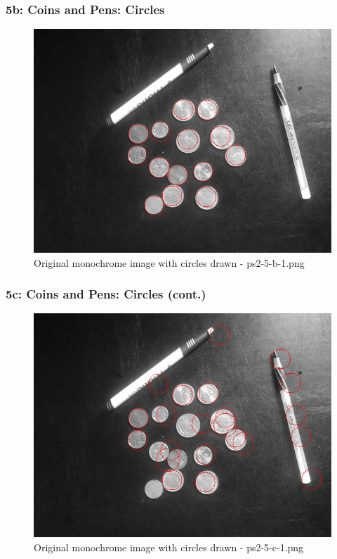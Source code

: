     \begin{frame}
		\frametitle{5b: Coins and Pens: Circles}
		
		\begin{figure}[!htb]
			\centering
			\includegraphics[height=0.65\textheight]{./output/ps2-5-b-1.png}
			\caption{Original monochrome image with circles drawn - ps2-5-b-1.png} 
		\end{figure}	
		
	\end{frame}
    
    \begin{frame}
		\frametitle{5c: Coins and Pens: Circles (cont.)}
		
		\begin{figure}[!htb]
			\centering
			\includegraphics[height=0.65\textheight]{./output/ps2-5-c-1.png}
			\caption{Original monochrome image with circles drawn - ps2-5-c-1.png} 
		\end{figure}	
		
	\end{frame}
    
